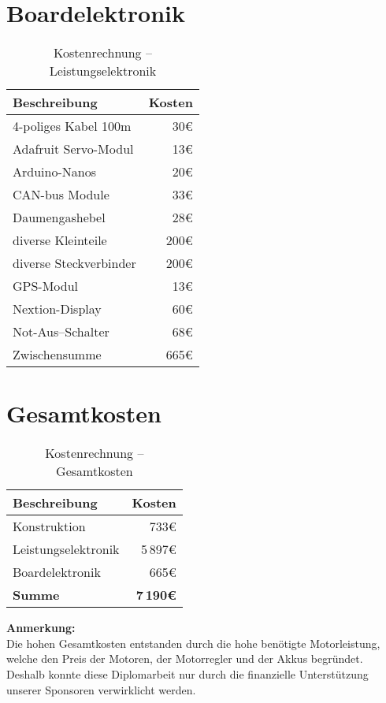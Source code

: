 \section{Boardelektronik}
\begin{table}[H]
    \centering
    \begin{tabular}{|l|r|}
        \hline
        \textbf{Beschreibung} & \textbf{Kosten}\\\hline
        4-poliges Kabel 100m & 30\euro\\
        Adafruit Servo-Modul & 13\euro\\
        Arduino-Nanos & 20\euro\\
        CAN-bus Module & 33\euro\\
        Daumengashebel & 28\euro\\
        diverse Kleinteile & 200\euro\\
        diverse Steckverbinder & 200\euro\\
        GPS-Modul & 13\euro\\
        Nextion-Display & 60\euro\\
        Not-Aus--Schalter & 68\euro\\        
        \hline
        Zwischensumme & 665\euro\\\hline
    \end{tabular}
    \caption{Kostenrechnung -- Leistungselektronik}
\end{table}

\section{Gesamtkosten}
\begin{table}[H]
    \centering
    \begin{tabular}{|l|r|}
        \hline
        \textbf{Beschreibung} & \textbf{Kosten}\\\hline
        Konstruktion & 733\euro\\
        Leistungselektronik & 5\,897\euro\\
        Boardelektronik & 665\euro\\
        \hline
        \textbf{Summe} & \textbf{7\,190\euro}\\\hline
    \end{tabular}
    \caption{Kostenrechnung -- Gesamtkosten}
\end{table}

\textbf{Anmerkung:}\\
Die hohen Gesamtkosten entstanden durch die hohe benötigte Motorleistung, welche den Preis der Motoren, der Motorregler und der Akkus begründet. Deshalb konnte diese Diplomarbeit nur durch die finanzielle Unterstützung unserer Sponsoren verwirklicht werden.
